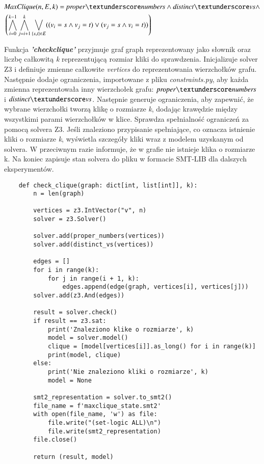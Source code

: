 \begin{align*}
	&\MaxClique(n, E, k) = \propernumbers  \land \distinctvs  \land \\
	&\left( \bigwedge_{i=0}^{k-1} \bigwedge_{j=i+1}^{k} \bigvee_{\{s,t\} \in E} ((v_i = s \land v_j = t) \lor (v_j = s \land v_i = t)) \right)	
\end{align*}

Funkcja \textit{\textbf{'check\textunderscore clique'}} przyjmuje graf graph reprezentowany jako słownik oraz liczbę całkowitą \textit{k} reprezentującą rozmiar kliki do sprawdzenia. Inicjalizuje solver Z3 i definiuje zmienne całkowite \textit{vertices} do reprezentowania wierzchołków grafu. Następnie dodaje ograniczenia, importowane z pliku \textit{constraints.py}, aby każda zmienna reprezentowała inny wierzchołek grafu: $\propernumbers$ i $\distinctvs$. Następnie generuje ograniczenia, aby zapewnić, że wybrane wierzchołki tworzą klikę o rozmiarze \textit{k}, dodając krawędzie między wszystkimi parami wierzchołków w klice. Sprawdza spełnialność ograniczeń za pomocą solvera Z3. Jeśli znaleziono przypisanie spełniające, co oznacza istnienie kliki o rozmiarze \textit{k}, wyświetla szczegóły kliki wraz z modelem uzyskanym od solvera. W przeciwnym razie informuje, że w grafie nie istnieje klika o rozmiarze k. Na koniec zapisuje stan solvera do pliku w formacie SMT-LIB dla dalszych eksperymentów.

\begin{lstlisting}
	def check_clique(graph: dict[int, list[int]], k):	
		n = len(graph)
		
		vertices = z3.IntVector("v", n)
		solver = z3.Solver()
		
		solver.add(proper_numbers(vertices))
		solver.add(distinct_vs(vertices))
		
		edges = []
		for i in range(k):
			for j in range(i + 1, k):
				edges.append(edge(graph, vertices[i], vertices[j]))
		solver.add(z3.And(edges))
		
		result = solver.check() 
		if result == z3.sat:
			print('Znaleziono klike o rozmiarze', k)
			model = solver.model()
			clique = [model[vertices[i]].as_long() for i in range(k)]
			print(model, clique)
		else:
			print('Nie znaleziono kliki o rozmiarze', k)
			model = None
		
		smt2_representation = solver.to_smt2()
		file_name = f'maxclique_state.smt2'
		with open(file_name, 'w') as file:
			file.write("(set-logic ALL)\n")
			file.write(smt2_representation)  
		file.close()
		
		return (result, model)
	
\end{lstlisting}

